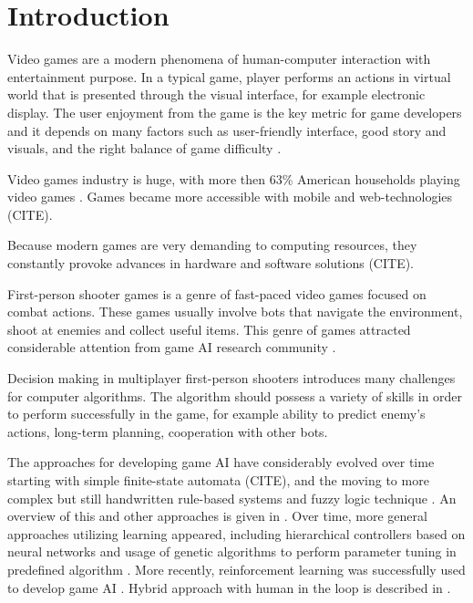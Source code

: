 \section{Introduction}

Video games are a modern phenomena of human-computer interaction with entertainment purpose.
In a typical game, player performs an actions in virtual world that is presented through the visual interface, for example electronic display.
The user enjoyment from the game is the key metric for game developers and it depends on many factors such as user-friendly interface, good story and visuals, and the right balance of game difficulty \cite{VideoGameEnjoyment}.

Video games industry is huge, with more then 63\% American households playing video games \cite{VideoGameFacts}.
Games became more accessible with mobile and web-technologies (CITE).


Because modern games are very demanding to computing resources, they constantly provoke advances in hardware and software solutions (CITE).

First-person shooter games is a genre of fast-paced video games focused on combat actions.
These games usually involve bots that navigate the environment, shoot at enemies and collect useful items.
This genre of games attracted considerable attention from game AI research community \cite{MLinFPS}.

Decision making in multiplayer first-person shooters introduces many challenges for computer algorithms.
The algorithm should possess a variety of skills in order to perform successfully in the game, 
for example ability to predict enemy's actions, long-term planning, cooperation with other bots.


The approaches for developing game AI have considerably evolved over time starting with simple finite-state automata (CITE), and the moving to more complex but still handwritten rule-based systems \cite{RuleBased} and fuzzy logic technique \cite{FuzzyLogic}. An overview of this and other approaches is given in \cite{AITechniques}.
Over time, more general approaches utilizing learning appeared,
including hierarchical controllers based on neural networks \cite{HierarchicalController} and usage of genetic algorithms to perform parameter tuning in predefined algorithm \cite{GeneticTuning}.
More recently, reinforcement learning was successfully used to develop game AI \cite{RLGallagher}.
Hybrid approach with human in the loop is described in \cite{InteractiveGallagher}.

